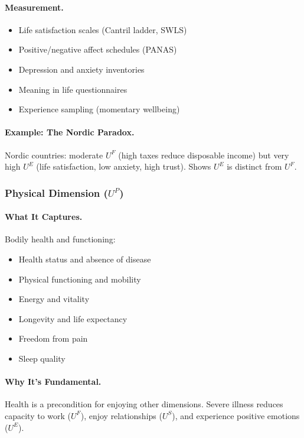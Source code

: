 \documentclass[12pt,a4paper]{article}
\begin{document}
\paragraph{Measurement.}
\begin{itemize}
  \item Life satisfaction scales (Cantril ladder, SWLS)
  \item Positive/negative affect schedules (PANAS)
  \item Depression and anxiety inventories
  \item Meaning in life questionnaires
  \item Experience sampling (momentary wellbeing)
\end{itemize}

\paragraph{Example: The Nordic Paradox.}
Nordic countries: moderate $U^F$ (high taxes reduce disposable income)
but very high $U^E$ (life satisfaction, low anxiety, high trust).
Shows $U^E$ is distinct from $U^F$.

\subsubsection{Physical Dimension ($U^P$)}

\paragraph{What It Captures.}
Bodily health and functioning:
\begin{itemize}
  \item Health status and absence of disease
  \item Physical functioning and mobility
  \item Energy and vitality
  \item Longevity and life expectancy
  \item Freedom from pain
  \item Sleep quality
\end{itemize}

\paragraph{Why It's Fundamental.}
Health is a precondition for enjoying other dimensions.
Severe illness reduces capacity to work ($U^F$), enjoy relationships ($U^S$),
and experience positive emotions ($U^E$).
\end{document}
